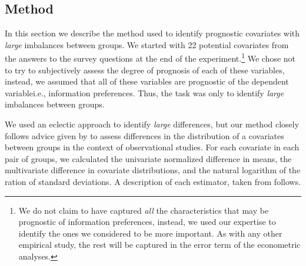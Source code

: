 %
%
%   
%
%
% 

\subsection{Method}

In this section we describe the method used to identify prognostic covariates with \emph{large} imbalances between groups. We started with 22 potential covariates from the answers to the survey questions at the end of the experiment.\footnote{We do not claim to have captured \emph{all} the characteristics that may be prognostic of information preferences, instead, we used our expertise to identify the ones we considered to be more important. As with any other empirical study, the rest will be captured in the error term of the econometric analyses.} We chose not to try to subjectively assess the degree of prognosis of each of these variables, instead, we assumed that all of these variables are prognostic of the dependent variable\textemdash i.e., information preferences. Thus, the task was only to identify \emph{large} imbalances between groups.

We used an eclectic approach to identify \emph{large} differences, but our method closely follows advice given by \citet{imbensCausalInferenceStatistics2015} to assess differences in the distribution of a covariates between groups in the context of observational studies. For each covariate in each pair of groups, we calculated the univariate normalized difference in means, the multivariate difference in covariate distributions, and the natural logarithm of the ration of standard deviations. A description of each estimator, taken from \citet{imbensCausalInferenceStatistics2015} follows.


